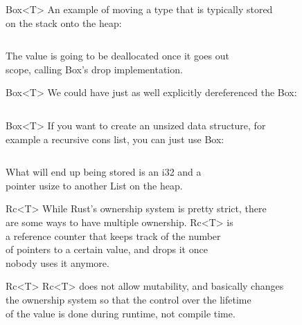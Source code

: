 \documentclass[usenames,dvipsnames,10pt,aspectratio=169]{beamer}
\begin{document}
\begin{frame}{Box<T>}
	\large
	An example of moving a type that is typically stored\\
	on the stack onto the heap:
	\vspace{0.4cm}
	\inputminted[fontsize=\large]{rust}{code/box1.rs}
	\vspace{0.4cm}
	The value is going to be deallocated once it goes out\\
	scope, calling Box's \textcolor{ucuyellow}{drop} implementation.\\
\end{frame}

\begin{frame}{Box<T>}
	\large
	We could have just as well explicitly dereferenced the Box:
	\vspace{0.4cm}
	\inputminted[fontsize=\large]{rust}{code/box2.rs}
\end{frame}


\begin{frame}{Box<T>}
	\large
	If you want to create an unsized data structure, for\\
	example a recursive cons list, you can just use Box:
	\vspace{0.4cm}
	\inputminted[fontsize=\normalsize]{rust}{code/box3.rs}
	\vspace{0.2cm}
	What will end up being stored is an \textcolor{ucuyellow}{i32} and a\\
	pointer \textcolor{ucuyellow}{usize} to another List on the heap.
\end{frame}

\begin{frame}{Rc<T>}
	\large
	While Rust's ownership system is pretty strict, there\\
	are some ways to have multiple ownership. \textcolor{ucuyellow}{Rc<T>} is\\
	a reference counter that keeps track of the number\\
	of pointers to a certain value, and drops it once\\
	nobody uses it anymore.
\end{frame}

\begin{frame}{Rc<T>}
	\large
	\textcolor{ucuyellow}{Rc<T>} does not allow mutability, and basically changes\\
	the ownership system so that the control over the lifetime\\
	of the value is done during runtime, not compile time.\\
\end{frame}
\end{document}
